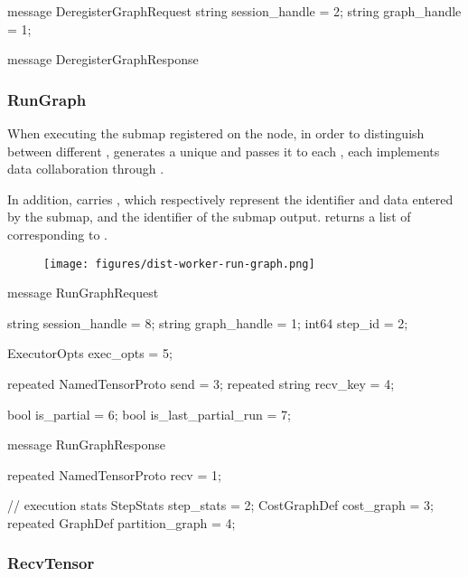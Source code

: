 \begin{content}
\begin{leftbar}
\begin{c++}
message DeregisterGraphRequest {
  string session_handle = 2;
  string graph_handle = 1;
}

message DeregisterGraphResponse {
}
\end{c++}
\end{leftbar}

\subsubsection{RunGraph}

When executing the submap registered on the  node, in order to distinguish between different ,  generates a unique  and passes it to each , each  implements data collaboration through .

In addition,  carries , which respectively represent the  identifier and data entered by the submap, and the  identifier of the submap output.  returns a list of  corresponding to .

\begin{figure}[H]
\centering
\texttt{[image: figures/dist-worker-run-graph.png]}
\caption{}
 \label{fig:dist-worker-run-graph}
\end{figure}

\begin{leftbar}
\begin{c++}
message RunGraphRequest {
  string session_handle = 8;
  string graph_handle = 1;
  int64 step_id = 2;

  ExecutorOpts exec_opts = 5;

  repeated NamedTensorProto send = 3;
  repeated string recv_key = 4;

  bool is_partial = 6;
  bool is_last_partial_run = 7;
}

message RunGraphResponse {
  repeated NamedTensorProto recv = 1;

  // execution stats
  StepStats step_stats = 2;
  CostGraphDef cost_graph = 3;
  repeated GraphDef partition_graph = 4;
}
\end{c++}
\end{leftbar}

\subsubsection{RecvTensor}


\end{content}
